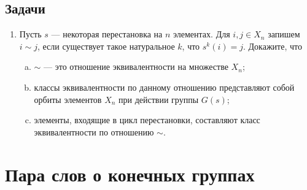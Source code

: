 \subsection*{Задачи}

\begin{enumerate}
\item Пусть $s$ --- некоторая перестановка на $n$ элементах. Для $i,j\in X_n$ запишем $i\sim j$, если существует такое натуральное $k$, что $s^k(i)=j$. Докажите, что
\begin{enumerate}[a)]
\item $\sim$ --- это отношение эквивалентности на множестве $X_n$;
\item классы эквивалентности по данному отношению представляют собой орбиты элементов $X_n$ при действии группы $G(s)$;
\item элементы, входящие в цикл перестановки, составляют класс эквивалентности по отношению $\sim$.
\end{enumerate}
\end{enumerate}



\section{Пара слов о конечных группах}



